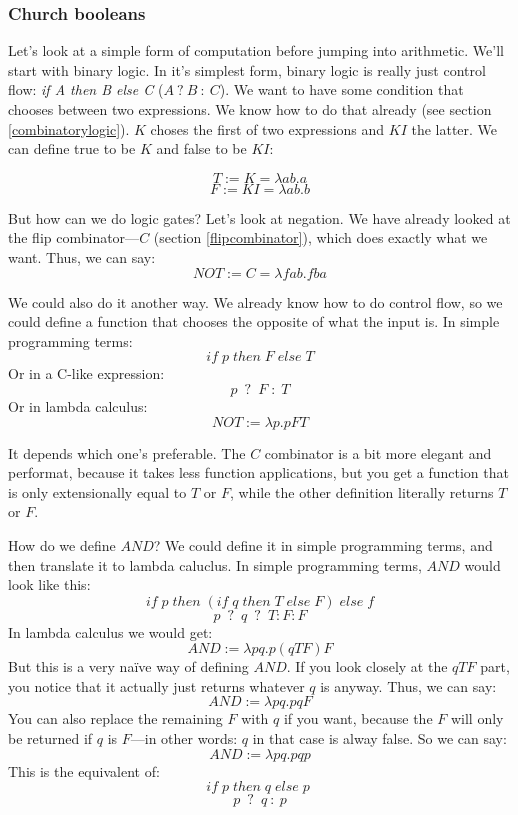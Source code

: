 \documentclass[11pt]{article}
\begin{document}
\subsubsection{Church booleans}

Let's look at a simple form of computation before jumping into arithmetic.
We'll start with binary logic. In it's simplest form, binary logic is really
just control flow: \emph{if A then B else C} (\(A\:?\:B\::\:C\)). We want to
have some condition that chooses between two expressions. We know how to do
that already (see section \ref{combinatorylogic}). \(K\) choses the first of
two expressions and \(KI\) the latter. We can define true to be \(K\) and false
to be \(KI\):

\[T:=K=\lambda ab.a\]
\[F:=KI=\lambda ab.b\]

But how can we do logic gates? Let's look at negation. We have already looked
at the flip combinator---\(C\) (section \ref{flipcombinator}), which does
exactly what we want. Thus, we can say:
\[NOT:=C=\lambda fab.fba\]

We could also do it another way. We already know how to do control flow, so we
could define a function that chooses the opposite of what the input is. In
simple programming terms:
\[if\;p\;then\;F\;else\;T\]
Or in a C-like expression:
\[p\enspace ?\enspace F\;:\;T\]
Or in lambda calculus:
\[NOT:=\lambda p.pFT\]

It depends which one's preferable. The \(C\) combinator is a bit more elegant
and performat, because it takes less function applications, but you get a
function that is only extensionally equal to \(T\) or \(F\), while the other
definition literally returns \(T\) or \(F\).

How do we define \(AND\)? We could define it in simple programming terms, and
then translate it to lambda caluclus. In simple programming terms, \(AND\)
would look like this:
\[if\;p\;then\;(if\;q\;then\;T\;else\;F)\;else\;f\]
\[p\enspace ?\enspace q\enspace ?\enspace T:F:F\]
In lambda calculus we would get:
\[AND:=\lambda pq.p(qTF)F\]
But this is a very naïve way of defining \(AND\). If you look closely at the
\(qTF\) part, you notice that it actually just returns whatever \(q\) is
anyway. Thus, we can say:
\[AND:=\lambda pq.pqF\]
You can also replace the remaining \(F\) with \(q\) if you want, because the
\(F\) will only be returned if \(q\) is \(F\)---in other words: \(q\) in that
case is alway false. So we can say:
\[AND:=\lambda pq.pqp\]
This is the equivalent of:
\[if\; p\; then\; q\; else\; p\;\]
\[p\enspace ?\enspace q\::\:p\]
\end{document}
